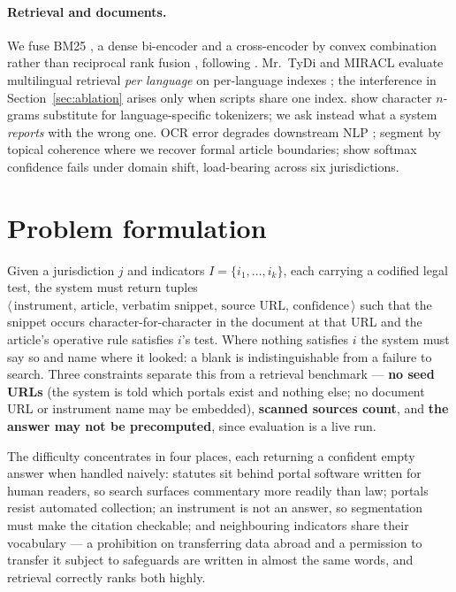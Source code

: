 \documentclass{article}
\begin{document}
\paragraph{Retrieval and documents.} We fuse BM25 \citep{robertson2009bm25}, a
dense bi-encoder \citep{karpukhin2020dpr} and a cross-encoder
\citep{nogueira2020monot5} by convex combination rather than reciprocal rank
fusion \citep{cormack2009rrf}, following \citet{bruch2022fusion}. Mr.\ TyDi and
MIRACL evaluate multilingual retrieval \emph{per language} on per-language
indexes \citep{zhang2021mrtydi,zhang2023miracl}; the interference in
Section~\ref{sec:ablation} arises only when scripts share one index.
\citet{ogundepo2022whitespace} show character $n$-grams substitute for
language-specific tokenizers; we ask instead what a system \emph{reports} with
the wrong one. OCR error degrades downstream NLP \citep{vanstrien2020ocr};
\citet{aumiller2021segmentation} segment by topical coherence where we recover
formal article boundaries; \citet{kamath2020selective} show softmax confidence
fails under domain shift, load-bearing across six jurisdictions.

\section{Problem formulation}
\label{sec:problem}

Given a jurisdiction $j$ and indicators $I=\{i_1,\dots,i_k\}$, each carrying a
codified legal test, the system must return tuples
$\langle\,\text{instrument},\,\text{article},\,\text{verbatim snippet},\,
\text{source URL},\,\text{confidence}\,\rangle$ such that the snippet occurs
character-for-character in the document at that URL and the article's operative
rule satisfies $i$'s test. Where nothing satisfies $i$ the system must say so and
name where it looked: a blank is indistinguishable from a failure to search.
Three constraints separate this from a retrieval benchmark --- \textbf{no seed
URLs} (the system is told which portals exist and nothing else; no document URL
or instrument name may be embedded), \textbf{scanned sources count}, and
\textbf{the answer may not be precomputed}, since evaluation is a live run.

The difficulty concentrates in four places, each returning a confident empty
answer when handled naively: statutes sit behind portal software written for
human readers, so search surfaces commentary more readily than law; portals
resist automated collection; an instrument is not an answer, so segmentation must
make the citation checkable; and neighbouring indicators share their vocabulary
--- a prohibition on transferring data abroad and a permission to transfer it
subject to safeguards are written in almost the same words, and retrieval
correctly ranks both highly.
\end{document}
